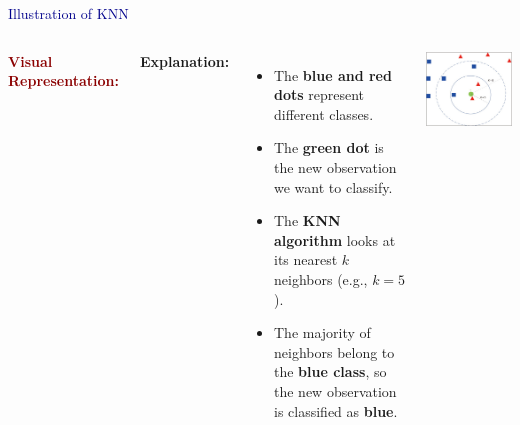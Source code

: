 \begin{frame}{\textcolor{darkblue}{Illustration of KNN}}
    \begin{columns}
        \textbf{\textcolor{darkred}{Visual Representation:}}
        \medskip

        \textbf{Explanation:}
        \begin{itemize}
            \item The \textbf{blue and red dots} represent different classes.
            \item The \textbf{green dot} is the new observation we want to classify.
            \item The \textbf{KNN algorithm} looks at its nearest \( k \) neighbors (e.g., \( k=5 \)).
            \item The majority of neighbors belong to the \textbf{blue class}, so the new observation is classified as \textbf{blue}.
        \end{itemize}
        
        \centering
        \includegraphics[width=\linewidth]{Sections/TP3/Images/KNN.jpg}
    \end{columns}
\end{frame}


